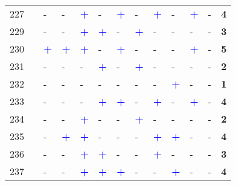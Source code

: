 \begin{longtable}{p{0.5cm}p{4.6cm}p{0.3cm}p{0.3cm}p{0.3cm}p{0.3cm}p{0.3cm}p{0.3cm}p{0.3cm}p{0.3cm}p{0.3cm}p{0.3cm}p{1cm}}
    \small{227} & \small{\textcite{zhao_public_2022}}\index{Zhao, Pengjun|pagebf} & - & - & \textcolor{blue}{\textbf{+}} & - & \textcolor{blue}{\textbf{+}} & - & \textcolor{blue}{\textbf{+}} & - & \textcolor{blue}{\textbf{+}} & - & \textbf{4}\\
    \small{229} & \small{\textcite{zhong_layout_2021}}\index{Zhong, Hongming|pagebf} & - & - & \textcolor{blue}{\textbf{+}} & \textcolor{blue}{\textbf{+}} & - & \textcolor{blue}{\textbf{+}} & - & - & - & - & \textbf{3}\\
    \small{230} & \small{\textcite{zhou_spatially_2023}}\index{Zhou, X.|pagebf} & \textcolor{blue}{\textbf{+}} & \textcolor{blue}{\textbf{+}} & \textcolor{blue}{\textbf{+}} & - & \textcolor{blue}{\textbf{+}} & - & - & - & \textcolor{blue}{\textbf{+}} & - & \textbf{5}\\
    \small{231} & \small{\textcite{zhu_improved_2021}}\index{Zhu, Zhenjun|pagebf} & - & - & - & \textcolor{blue}{\textbf{+}} & - & \textcolor{blue}{\textbf{+}} & - & - & - & - & \textbf{2}\\
    \small{232} & \small{\textcite{ziedan_complement_2021}}\index{Ziedan, Abubakr|pagebf} & - & - & - & - & - & - & - & \textcolor{blue}{\textbf{+}} & - & - & \textbf{1}\\
    \small{233} & \small{\textcite{zuniga-garcia_evaluation_2022}}\index{Zuniga-Garcia, Natalia|pagebf} & - & - & - & \textcolor{blue}{\textbf{+}} & \textcolor{blue}{\textbf{+}} & - & \textcolor{blue}{\textbf{+}} & - & \textcolor{blue}{\textbf{+}} & - & \textbf{4}\\
    \small{234} & \small{\textcite{zuo_bikeway_2019}}\index{Zuo, Ting|pagebf} & - & - & \textcolor{blue}{\textbf{+}} & - & - & \textcolor{blue}{\textbf{+}} & - & - & - & - & \textbf{2}\\
    \small{235} & \small{\textcite{zuo_promote_2020}}\index{Zuo, Ting|pagebf} & - & \textcolor{blue}{\textbf{+}} & \textcolor{blue}{\textbf{+}} & - & - & - & \textcolor{blue}{\textbf{+}} & \textcolor{blue}{\textbf{+}} & - & - & \textbf{4}\\
    \small{236} & \small{\textcite{zuo_incorporating_2021}}\index{Zuo, Ting|pagebf} & - & - & \textcolor{blue}{\textbf{+}} & \textcolor{blue}{\textbf{+}} & - & - & \textcolor{blue}{\textbf{+}} & - & - & - & \textbf{3}\\
    \small{237} & \small{\textcite{zuo_determining_2018}}\index{Zuo, Ting|pagebf} & - & - & \textcolor{blue}{\textbf{+}} & \textcolor{blue}{\textbf{+}} & \textcolor{blue}{\textbf{+}} & - & - & \textcolor{blue}{\textbf{+}} & - & - & \textbf{4}\\

\end{longtable}
